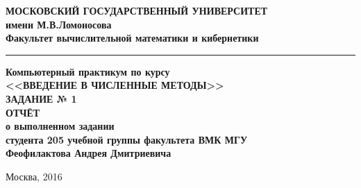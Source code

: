 \begin{titlepage}
\begin{center}

\textbf{\small 
    МОСКОВСКИЙ ГОСУДАРСТВЕННЫЙ УНИВЕРСИТЕТ \\ 
    \bigskip имени М.В.Ломоносова \\ 
    \bigskip Факультет вычислительной математики и кибернетики
}
\hrule

\vfill{}

\textbf{
    Компьютерный практикум по курсу \\ \bigskip
    <<ВВЕДЕНИЕ В ЧИСЛЕННЫЕ МЕТОДЫ>> \\ \bigskip
    ЗАДАНИЕ № 1 \\ \bigskip \bigskip
    ОТЧЁТ \\ \bigskip
    о выполненном задании \\ \bigskip
    студента 205 учебной группы факультета ВМК МГУ \\ \bigskip
    Феофилактова Андрея Дмитриевича
}

\vfill
Москва, 2016

\end{center}
\end{titlepage}
